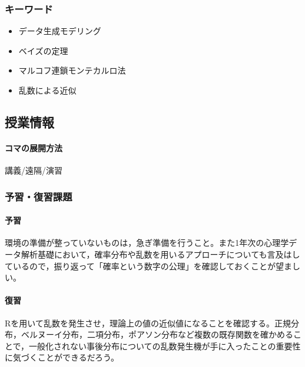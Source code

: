 \subsubsection{キーワード}
\begin{itemize}
	\item データ生成モデリング
	\item ベイズの定理
	\item マルコフ連鎖モンテカルロ法
	\item 乱数による近似
\end{itemize}
\subsection{授業情報}
\paragraph{コマの展開方法}
講義/遠隔/演習
\subsubsection{予習・復習課題}
\paragraph{予習}環境の準備が整っていないものは，急ぎ準備を行うこと。また1年次の心理学データ解析基礎において，確率分布や乱数を用いるアプローチについても言及はしているので，振り返って「確率という数字の公理」を確認しておくことが望ましい。
\paragraph{復習}Rを用いて乱数を発生させ，理論上の値の近似値になることを確認する。正規分布，ベルヌーイ分布，二項分布，ポアソン分布など複数の既存関数を確かめることで，一般化されない事後分布についての乱数発生機が手に入ったことの重要性に気づくことができるだろう。